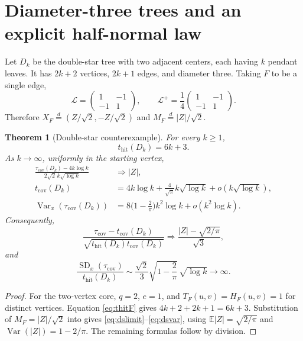 \documentclass[11pt]{amsart}
\newtheorem{theorem}{Theorem}[section]
\theoremstyle{remark}
\numberwithin{equation}{section}
\DeclareMathOperator{\Var}{Var}
\DeclareMathOperator{\SD}{SD}
\newcommand{\E}{\mathbb{E}}
\newcommand{\tcov}{t_{\mathrm{cov}}}
\newcommand{\thit}{t_{\mathrm{hit}}}
\newcommand{\taucov}{\tau_{\mathrm{cov}}}
\newcommand{\Lap}{\mathcal{L}}
\begin{document}
\section{Diameter-three trees and an explicit half-normal law}\label{sec:doublestar}

Let $D_k$ be the double-star tree with two adjacent centers, each having $k$ pendant leaves. It has $2k+2$ vertices, $2k+1$ edges, and diameter three. Taking $F$ to be a single edge,
\[
\Lap=\begin{pmatrix}1&-1\\-1&1\end{pmatrix},\qquad \Lap^+=\frac14\begin{pmatrix}1&-1\\-1&1\end{pmatrix}.
\]
Therefore $X_F\overset{d}{=}(Z/\sqrt2,-Z/\sqrt2)$ and $M_F\overset{d}{=}|Z|/\sqrt2$.

\begin{theorem}[Double-star counterexample]\label{thm:doublestar}
For every $k\ge 1$,
\begin{equation}\label{eq:dsthit}
\thit(D_k)=6k+3.
\end{equation}
As $k\to\infty$, uniformly in the starting vertex,
\begin{align}
\frac{\taucov(D_k)-4k\log k}{2\sqrt2\,k\sqrt{\log k}}&\Longrightarrow|Z|,\label{eq:dslimit}\\
\tcov(D_k)&=4k\log k+\frac4{\sqrt\pi}k\sqrt{\log k}+o(k\sqrt{\log k}),\label{eq:dsmean}\\
\Var_x(\taucov(D_k))&=8\Big(1-\frac2\pi\Big)k^2\log k+o(k^2\log k).\label{eq:dsvar}
\end{align}
Consequently,
\begin{equation}\label{eq:dscentered}
\frac{\taucov-\tcov(D_k)}{\sqrt{\thit(D_k)\tcov(D_k)}}\Longrightarrow\frac{|Z|-\sqrt{2/\pi}}{\sqrt3},
\end{equation}
and
\[
\frac{\SD_x(\taucov)}{\thit(D_k)}\sim\frac{\sqrt2}{3}\sqrt{1-\frac2\pi}\,\sqrt{\log k}\longrightarrow\infty.
\]
\end{theorem}

\begin{proof}
For the two-vertex core, $q=2$, $e=1$, and $T_F(u,v)=H_F(u,v)=1$ for distinct vertices. Equation \eqref{eq:thitF} gives $4k+2+2k+1=6k+3$. Substitution of $M_F=|Z|/\sqrt2$ into  gives \eqref{eq:dslimit}--\eqref{eq:dsvar}, using $\E|Z|=\sqrt{2/\pi}$ and $\Var(|Z|)=1-2/\pi$. The remaining formulas follow by division.
\end{proof}
\end{document}
